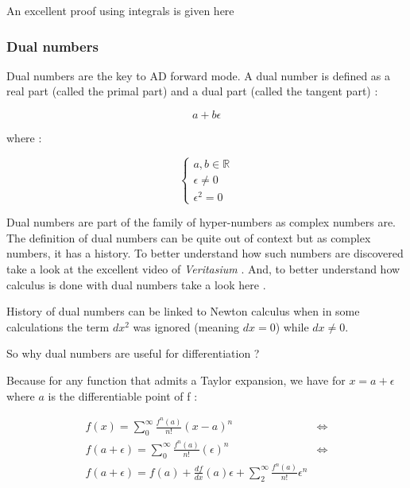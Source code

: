 \documentclass[12pt]{article}
\begin{document}
An excellent proof using integrals is given here \cite{stackexchange_How_taylor_series_derived}

\subsubsection{Dual numbers}


Dual numbers \cite{wiki_dual_number} are the key to AD forward mode. A dual number is defined as a real part (called the primal part) and a dual part (called the tangent part) : 

$$
a + b\epsilon
$$

where :

$$
\begin{cases}
a,b \in \mathbb{R} \\
\epsilon \neq 0 \\
\epsilon^2 = 0
\end{cases}
$$


Dual numbers are part of the family of hyper-numbers as complex numbers are.
The definition of dual numbers can be quite out of context but as complex numbers, it has a history. To better understand how such numbers are discovered take a look at the excellent video of {\it Veritasium} \cite{youtube_veritasium_imaginary_numbers}. And, to better understand how calculus is done with dual numbers take a look here \cite{youtube_strange_cousin_complex_numbers_the_dual_numbers}.

History of dual numbers \cite{stackexchange_dual_number_newton} can be linked to Newton calculus when in some calculations the term $dx^2$ was ignored (meaning $dx=0$) while $dx \neq 0$. 

So why dual numbers are useful for differentiation ?

Because for any function that admits a Taylor expansion, we have for $x=a+\epsilon$ where $a$ is the differentiable point of f :

\begin{equation*}
    \begin{split}
        f(x) = \sum_0^\infty  \frac{f^n(a)}{n!} (x-a)^n  &\Leftrightarrow \\
        f(a+\epsilon) = \sum_0^\infty  \frac{f^n(a)}{n!} (\epsilon)^n &\Leftrightarrow \\
        f(a+\epsilon) = f(a) + \frac{df}{dx}(a) \epsilon + \sum_2^\infty  \frac{f^n(a)}{n!} \epsilon^n
    \end{split}
\end{equation*}
\end{document}
